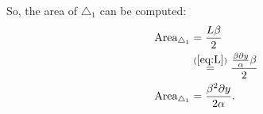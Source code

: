 So, the area of $\triangle_1$ can be computed:
\begin{align}
    \text{Area}_{\triangle_1} &= \frac{L\beta}{2} \\
    &\overset{(\ref{eq:L})}{=} \frac{\frac{\beta \partial y}{\alpha}\beta}{2} \\
    \text{Area}_{\triangle_1} &= \frac{\beta^2 \partial y}{2\alpha}. \label{eq:ardd}
\end{align}





